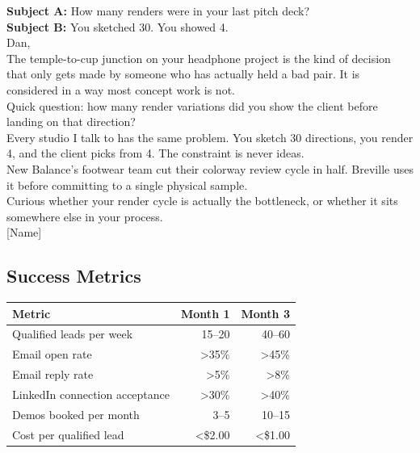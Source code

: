 \documentclass[11pt, letterpaper]{article}
\begin{document}
\begin{callout}
  \textbf{Subject A:} How many renders were in your last pitch deck?\\
  \textbf{Subject B:} You sketched 30. You showed 4.\\[0.8em]
  Dan,\\[0.5em]
  The temple-to-cup junction on your headphone project is the kind of decision
  that only gets made by someone who has actually held a bad pair. It is
  considered in a way most concept work is not.\\[0.5em]
  Quick question: how many render variations did you show the client before
  landing on that direction?\\[0.5em]
  Every studio I talk to has the same problem. You sketch 30 directions, you
  render 4, and the client picks from 4. The constraint is never ideas.\\[0.5em]
  New Balance's footwear team cut their colorway review cycle in half.
  Breville uses it before committing to a single physical sample.\\[0.5em]
  Curious whether your render cycle is actually the bottleneck, or whether
  it sits somewhere else in your process.\\[0.5em]
  [Name]
\end{callout}

\subsection{Success Metrics}

\begin{table}[H]
\centering
\begin{tabularx}{\linewidth}{@{} X r r @{}}
  \toprule
  \textbf{Metric} & \textbf{Month 1} & \textbf{Month 3} \\
  \midrule
  Qualified leads per week          & 15--20   & 40--60 \\
  Email open rate                   & >35\%    & >45\% \\
  Email reply rate                  & >5\%     & >8\% \\
  LinkedIn connection acceptance    & >30\%    & >40\% \\
  Demos booked per month            & 3--5     & 10--15 \\
  Cost per qualified lead           & <\$2.00  & <\$1.00 \\
  \bottomrule
\end{tabularx}
\end{table}
\end{document}
